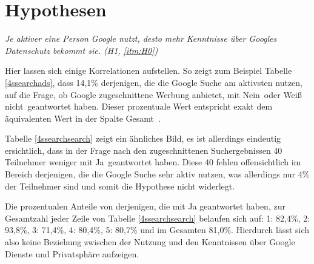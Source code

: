 \section{Hypothesen}
\textit{Je aktiver eine Person Google nutzt, desto mehr Kenntnisse über Googles Datenschutz bekommt sie. (H1, \ref{itm:H0})}

Hier lassen sich einige Korrelationen aufstellen. So zeigt zum Beispiel Tabelle \ref{4ssearchads}, dass 14,1\% derjenigen, die die Google Suche am aktivsten nutzen, auf die Frage, ob Google zugeschnittene Werbung anbietet, mit \glqq Nein\grqq\ oder \glqq Weiß nicht\grqq\ geantwortet haben. Dieser prozentuale Wert entspricht exakt dem äquivalenten Wert in der Spalte \glqq Gesamt\grqq\ .

Tabelle \ref{4ssearchsearch} zeigt ein ähnliches Bild, es ist allerdings eindeutig ersichtlich, dass in der Frage nach den zugeschnittenen Suchergebnissen 40 Teilnehmer weniger mit \glqq Ja\grqq\ geantwortet haben. Diese 40 fehlen offensichtlich im Bereich derjenigen, die die Google Suche sehr aktiv nutzen, was allerdings nur 4\% der Teilnehmer sind und somit die Hypothese nicht widerlegt.

Die prozentualen Anteile von derjenigen, die mit Ja geantwortet haben, zur Gesamtzahl jeder Zeile von Tabelle \ref{4ssearchsearch} belaufen sich auf: 1: 82,4\%, 2: 93,8\%, 3: 71,4\%, 4: 80,4\%, 5: 80,7\% und im Gesamten 81,0\%. Hierdurch lässt sich also keine Beziehung zwischen der Nutzung und den Kenntnissen über Google Dienste und Privatsphäre aufzeigen.

